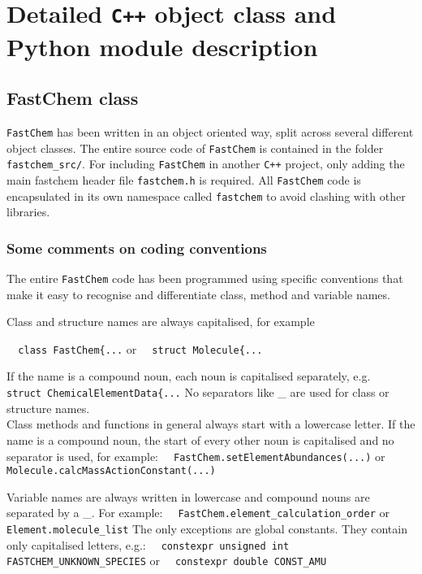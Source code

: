 \documentclass[numbers=noenddot]{fcmanual}
\newcommand{\fc}{\texttt{FastChem}\xspace}
\newcommand{\cpp}{\ttt{C++}\xspace}
\newcommand{\ttt}[1]{\texttt {#1}}
\begin{document}
\part{Detailed \texttt{C++} object class and Python module description}
\label{part:code_details}


\chapter{FastChem class}
\label{sec:fc_class}

\fc has been written in an object oriented way, split across several different object classes. The entire source code of \fc is contained in the folder \verb|fastchem_src/|. For including \fc in another \cpp project, only adding the main fastchem header file \verb|fastchem.h| is required. All \fc code is encapsulated in its own namespace called \lstinline!fastchem! to avoid clashing with other libraries.


\section{Some comments on coding conventions}

The entire \fc code has been programmed using specific conventions that make it easy to recognise and differentiate class, method and variable names.

Class and structure names are always capitalised, for example

\bigbreak
\lstinline!  class FastChem{...!
\bigbreak
or
\bigbreak
\lstinline!  struct Molecule{...!
\bigbreak

If the name is a compound noun, each noun is capitalised separately, e.g.
\bigbreak
\lstinline!  struct ChemicalElementData{...!
\bigbreak
No separators like \_ are used for class or structure names.\\

Class methods and functions in general always start with a lowercase letter. If the name is a compound noun, the start of every other noun is capitalised and no separator is used, for example:
\bigbreak
\lstinline!  FastChem.setElementAbundances(...)!
\bigbreak
or
\bigbreak
\lstinline!  Molecule.calcMassActionConstant(...)!
\bigbreak

Variable names are always written in lowercase and compound nouns are separated by a \_. For example:
\bigbreak
\lstinline!  FastChem.element_calculation_order!
\bigbreak
or
\bigbreak
\lstinline!  Element.molecule_list!
\bigbreak
The only exceptions are global constants. They contain only capitalised letters, e.g.:
\bigbreak
\lstinline!  constexpr unsigned int FASTCHEM_UNKNOWN_SPECIES!
\bigbreak
or
\bigbreak
\lstinline!  constexpr double CONST_AMU!
\bigbreak
\end{document}
